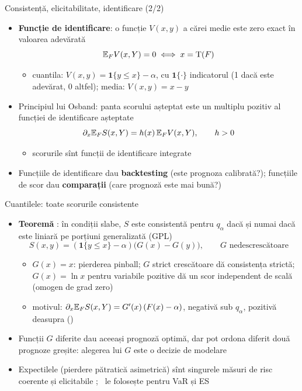 \begin{frame}{Consistență, elicitabilitate, identificare (2/2)}
\itemsize{\small}
\begin{itemize}
    \item \textbf{Funcție de identificare}: o funcție $V(x, y)$ a cărei medie este zero exact în valoarea adevărată
    \[ \mathbb{E}_F V(x, Y) = 0 \iff x = \mathrm T(F) \]
    \begin{itemize}
        \item cuantila: $V(x, y) = \mathbf 1\{y \le x\} - \alpha$, cu $\mathbf 1\{\cdot\}$ indicatorul (1 dacă este adevărat, 0 altfel); media: $V(x, y) = x - y$
    \end{itemize}
    \item Principiul lui Osband: panta scorului așteptat este un multiplu pozitiv al funcției de identificare așteptate 
    \[ \partial_x\mathbb{E}_F S(x, Y) = h(x)\,\mathbb{E}_F V(x, Y), \qquad h > 0 \]
    \begin{itemize}
        \item scorurile sînt funcții de identificare integrate
    \end{itemize}
    \item Funcțiile de identificare dau \textbf{backtesting} (este prognoza calibrată?); funcțiile de scor dau \textbf{comparații} (care prognoză este mai bună?) 
\end{itemize}
\end{frame}

\begin{frame}{Cuantilele: toate scorurile consistente}
\itemsize{\small}
\begin{itemize}
    \item \textbf{Teoremă} : în condiții slabe, $S$ este consistentă pentru $q_\alpha$ dacă și numai dacă este liniară pe porțiuni generalizată (GPL)
    \[ S(x, y) = (\mathbf 1\{y \le x\} - \alpha)\big(G(x) - G(y)\big), \qquad G \text{ nedescrescătoare} \]
    \begin{itemize}
        \item $G(x) = x$: pierderea pinball; $G$ strict crescătoare dă consistența strictă; $G(x) = \ln x$ pentru variabile pozitive dă un scor independent de scală (omogen de grad zero)
        \item motivul: $\partial_x\mathbb{E}_F S(x, Y) = G'(x)\,(F(x) - \alpha)$, negativă sub $q_\alpha$, pozitivă deasupra ()
    \end{itemize}
    \item Funcții $G$ diferite dau aceeași prognoză optimă, dar pot ordona diferit două prognoze greșite: alegerea lui $G$ este o decizie de modelare
    \item Expectilele (pierdere pătratică asimetrică) sînt singurele măsuri de risc coerente și elicitabile ; \ le folosește pentru VaR și ES
\end{itemize}
\end{frame}

